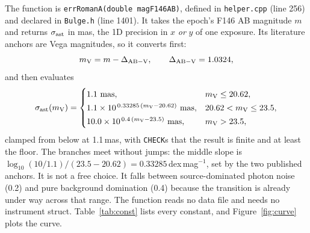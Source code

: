 \documentclass[english,10pt,a4paper]{article}
\newcommand{\code}[1]{\texttt{#1}}
\begin{document}
The function is \code{errRomanA(double magF146AB)}, defined in \code{helper.cpp} (line 256) and
declared in \code{Bulge.h} (line 1401). It takes the epoch's F146 AB magnitude $m$ and returns
$\sigma_{\rm ast}$ in mas, the 1D precision in $x$ \emph{or} $y$ of one exposure. Its
literature anchors are Vega magnitudes, so it converts first:
\begin{equation}
m_{\rm V} = m - \Delta_{\rm AB-V}, \qquad \Delta_{\rm AB-V} = 1.0324 ,
\end{equation}
and then evaluates
\begin{equation}
\sigma_{\rm ast}(m_{\rm V}) =
\begin{cases}
1.1\ {\rm mas}, & m_{\rm V} \le 20.62,\\[2pt]
1.1 \times 10^{\,0.33285\,(m_{\rm V}-20.62)}\ {\rm mas}, & 20.62 < m_{\rm V} \le 23.5,\\[2pt]
10.0 \times 10^{\,0.4\,(m_{\rm V}-23.5)}\ {\rm mas}, & m_{\rm V} > 23.5,
\end{cases}
\label{eq:sigast}
\end{equation}
clamped from below at 1.1\,mas, with \code{CHECK}s that the result is finite and at least the floor.
The branches meet without jumps: the middle slope is
$\log_{10}(10/1.1)/(23.5-20.62)=0.33285$\,dex\,mag$^{-1}$, set by the two published anchors.
It is not a free choice. It falls between source-dominated photon noise (0.2) and pure background
domination (0.4) because the transition is already under way across that range. The function reads no data file and needs no
instrument struct. Table~\ref{tab:const} lists every constant, and Figure~\ref{fig:curve} plots the curve.
\end{document}
